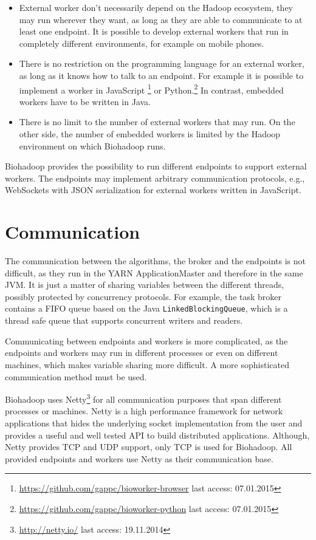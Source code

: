 \begin{itemize}
  \item External worker don't necessarily depend on the Hadoop ecosystem, they may run wherever they want, as long as they are able to communicate to at least one endpoint. It is possible to develop external workers that run in completely different environments, for example on mobile phones.
  \item There is no restriction on the programming language for an external worker, as long as it knows how to talk to an endpoint. For example it is possible to implement a worker in JavaScript \footnote{\url{https://github.com/gappc/bioworker-browser} last access: 07.01.2015} or Python.\footnote{\url{https://github.com/gappc/bioworker-python} last access: 07.01.2015} In contrast, embedded workers have to be written in Java.
  \item There is no limit to the number of external workers that may run. On the other side, the number of embedded workers is limited by the Hadoop environment on which Biohadoop runs.
\end{itemize}

Biohadoop provides the possibility to run different endpoints to support external workers. The endpoints may implement arbitrary communication protocols, e.g., WebSockets with JSON serialization for external workers written in JavaScript.

\section{Communication}
\label{chap:impl:communication}
The communication between the algorithms, the broker and the endpoints is not difficult, as they run in the YARN ApplicationMaster and therefore in the same JVM. It is just a matter of sharing variables between the different threads, possibly protected by concurrency protocols. For example, the task broker contains a FIFO queue based on the Java \texttt{LinkedBlockingQueue}, which is a thread safe queue that supports concurrent writers and readers.
  
Communicating between endpoints and workers is more complicated, as the endpoints and workers may run in different processes or even on different machines, which makes variable sharing more difficult. A more sophisticated communication method must be used.

Biohadoop uses Netty\footnote{\url{http://netty.io/} last access: 19.11.2014} for all communication purposes that span different processes or machines. Netty is a high performance framework for network applications that hides the underlying socket implementation from the user and provides a useful and well tested API to build distributed applications. Although, Netty provides TCP and UDP support, only TCP is used for Biohadoop. All provided endpoints and workers use Netty as their communication base.

